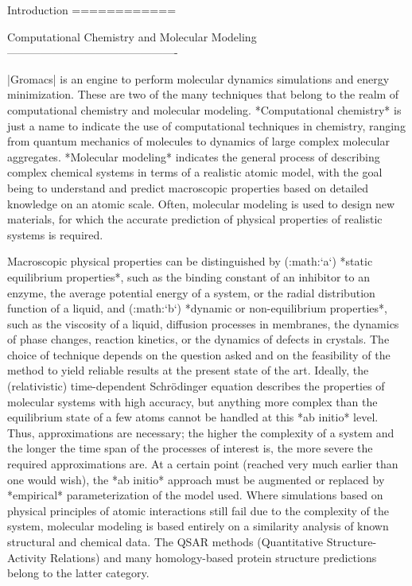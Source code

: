 Introduction
============

Computational Chemistry and Molecular Modeling
----------------------------------------------

|Gromacs| is an engine to perform molecular dynamics simulations and
energy minimization. These are two of the many techniques that belong to
the realm of computational chemistry and molecular modeling.
*Computational chemistry* is just a name to indicate the use of
computational techniques in chemistry, ranging from quantum mechanics of
molecules to dynamics of large complex molecular aggregates. *Molecular
modeling* indicates the general process of describing complex chemical
systems in terms of a realistic atomic model, with the goal being to
understand and predict macroscopic properties based on detailed
knowledge on an atomic scale. Often, molecular modeling is used to
design new materials, for which the accurate prediction of physical
properties of realistic systems is required.

Macroscopic physical properties can be distinguished by (:math:`a`)
*static equilibrium properties*, such as the binding constant of an
inhibitor to an enzyme, the average potential energy of a system, or the
radial distribution function of a liquid, and (:math:`b`) *dynamic or
non-equilibrium properties*, such as the viscosity of a liquid,
diffusion processes in membranes, the dynamics of phase changes,
reaction kinetics, or the dynamics of defects in crystals. The choice of
technique depends on the question asked and on the feasibility of the
method to yield reliable results at the present state of the art.
Ideally, the (relativistic) time-dependent Schrödinger equation
describes the properties of molecular systems with high accuracy, but
anything more complex than the equilibrium state of a few atoms cannot
be handled at this *ab initio* level. Thus, approximations are
necessary; the higher the complexity of a system and the longer the time
span of the processes of interest is, the more severe the required
approximations are. At a certain point (reached very much earlier than
one would wish), the *ab initio* approach must be augmented or replaced
by *empirical* parameterization of the model used. Where simulations
based on physical principles of atomic interactions still fail due to
the complexity of the system, molecular modeling is based entirely on a
similarity analysis of known structural and chemical data. The QSAR
methods (Quantitative Structure-Activity Relations) and many
homology-based protein structure predictions belong to the latter
category.

